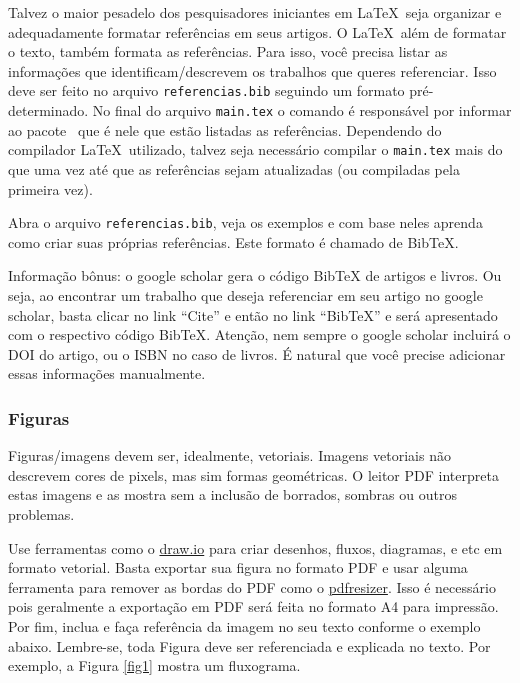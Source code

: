 \documentclass[
	article,			%
	12pt,				%
	oneside,			%
	a4paper,			%
	english,			%
	brazil,				%
	sumario=tradicional
]{abntex2}
\begin{document}
Talvez o maior pesadelo dos pesquisadores iniciantes em \LaTeX\ seja organizar e adequadamente formatar referências em seus artigos. O \LaTeX\ além de formatar o texto, também formata as referências. Para isso, você precisa listar as informações que identificam/descrevem os trabalhos que queres referenciar. Isso deve ser feito no arquivo \texttt{referencias.bib} seguindo um formato pré-determinado. No final do arquivo \texttt{main.tex} o comando \verb|| é responsável por informar ao pacote \abnTeX\ que é nele que estão listadas as referências. Dependendo do compilador \LaTeX\ utilizado, talvez seja necessário compilar o \texttt{main.tex} mais do que uma vez até que as referências sejam atualizadas (ou compiladas pela primeira vez).

Abra o arquivo \texttt{referencias.bib}, veja os exemplos e com base neles aprenda como criar suas próprias referências. Este formato é chamado de BibTeX.

Informação bônus: o google scholar gera o código BibTeX de artigos e livros. Ou seja, ao encontrar um trabalho que deseja referenciar em seu artigo no google scholar, basta clicar no link ``Cite'' e então no link ``BibTeX'' e será apresentado com o respectivo código BibTeX. Atenção, nem sempre o google scholar incluirá o DOI do artigo, ou o ISBN no caso de livros. É natural que você precise adicionar essas informações manualmente.

\subsubsection{Figuras}

Figuras/imagens devem ser, idealmente, vetoriais. Imagens vetoriais não descrevem cores de pixels, mas sim formas geométricas. O leitor PDF interpreta estas imagens e as mostra sem a inclusão de borrados, sombras ou outros problemas. 

Use ferramentas como o \href{https://draw.io}{draw.io} para criar desenhos, fluxos, diagramas, e etc em formato vetorial. Basta exportar sua figura no formato PDF e usar alguma ferramenta para remover as bordas do PDF como o \href{https://pdfresizer.com/crop}{pdfresizer}. Isso é necessário pois geralmente a exportação em PDF será feita no formato A4 para impressão. Por fim, inclua e faça referência da imagem no seu texto conforme o exemplo abaixo. Lembre-se, toda Figura deve ser referenciada e explicada no texto. Por exemplo, a Figura \ref{fig1} mostra um fluxograma.
\end{document}
